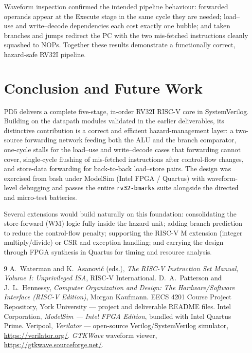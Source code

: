 \documentclass[11pt,a4paper]{article}
\newcommand{\code}[1]{\texttt{#1}}          %
\begin{document}
Waveform inspection confirmed the intended pipeline behaviour: forwarded operands appear at
the Execute stage in the same cycle they are needed; load--use and write--decode
dependencies each cost exactly one bubble; and taken branches and jumps redirect the PC
with the two mis-fetched instructions cleanly squashed to NOPs. Together these results
demonstrate a functionally correct, hazard-safe RV32I pipeline.

\section{Conclusion and Future Work}
\label{sec:conclusion}
PD5 delivers a complete five-stage, in-order RV32I RISC-V core in SystemVerilog. Building on
the datapath modules validated in the earlier deliverables, its distinctive contribution is
a correct and efficient hazard-management layer: a two-source forwarding network feeding
both the ALU and the branch comparator, one-cycle stalls for the load--use and
write--decode cases that forwarding cannot cover, single-cycle flushing of mis-fetched
instructions after control-flow changes, and store-data forwarding for back-to-back
load--store pairs. The design was exercised from bash under ModelSim (Intel FPGA / Quartus)
with waveform-level debugging and passes the entire \code{rv32-bmarks} suite alongside the
directed and micro-test batteries.

Several extensions would build naturally on this foundation: consolidating the store-forward
(WM) logic fully inside the hazard unit; adding branch prediction to reduce the control-flow
penalty; supporting the RISC-V M extension (integer multiply/divide) or CSR and exception
handling; and carrying the design through FPGA synthesis in Quartus for timing and resource
analysis.

\begin{thebibliography}{9}
 A.~Waterman and K.~Asanovi\'c (eds.),
  \emph{The RISC-V Instruction Set Manual, Volume I: Unprivileged ISA}, RISC-V
  International.
 D.~A.~Patterson and J.~L.~Hennessy,
  \emph{Computer Organization and Design: The Hardware/Software Interface (RISC-V
  Edition)}, Morgan Kaufmann.
 EECS 4201 Course Project Repository, York University --- project and
  deliverable README files.
 Intel Corporation, \emph{ModelSim --- Intel FPGA Edition}, bundled with
  Intel Quartus Prime.
 Veripool, \emph{Verilator} --- open-source Verilog/SystemVerilog
  simulator, \url{https://verilator.org/}.
 \emph{GTKWave} waveform viewer, \url{https://gtkwave.sourceforge.net/}.
\end{thebibliography}
\end{document}
